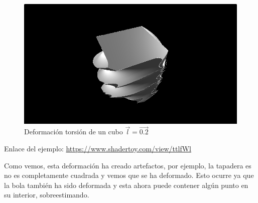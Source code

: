\begin{figure}[H]
  \centering
  \captionsetup{justification=centering}%
  \includegraphics[width=1.0\textwidth]{secciones/imagenes/sdf/3d/sdf_twist.png}
  \caption{Deformación torsión de un cubo \(\Vec{l}=\Vec{0.2}\)}
  \label{fig:twist}
\end{figure}

Enlace del ejemplo:
\url{https://www.shadertoy.com/view/ttlfWl}

Como vemos, esta deformación ha creado artefactos, por ejemplo, la tapadera es no es completamente cuadrada y vemos que se ha deformado. Esto ocurre ya que la bola también ha sido deformada y esta ahora puede contener algún punto en su interior, sobreestimando.